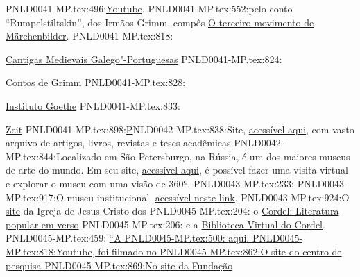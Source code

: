 {{{{{{{{{PNLD0041-MP.tex:496:\href{https://www.youtube.com/watch?v=1jdpM_spZe0&ab_channel=TheatroS%C3%A3oPedro}{Youtube}.
PNLD0041-MP.tex:552:pelo conto ``Rumpelstiltskin'', dos Irmãos Grimm, compôs \href{https://www.youtube.com/watch?v=zaX0IjTMChI&ab_channel=PacoM}{O terceiro movimento de Märchenbilder}.
PNLD0041-MP.tex:818:\item \href{https://cantigas.fcsh.unl.pt/index.asp}{Cantigas Medievais Galego"-Portuguesas}
PNLD0041-MP.tex:824:\item \href{https://www.grimmstories.com/pt/grimm_contos/index}{Contos de Grimm}
PNLD0041-MP.tex:828:\item \href{http://www.goethe.de/rio}{Instituto Goethe}
PNLD0041-MP.tex:833:\item \href{https://www.zeit.de/serie/kinderlieder?fbclid=IwAR0YTdmrrM24sDcmak__AxviJPibv0_Bxf9sx9XkX7g-4VxcKbNbRbVPrew&utm_referrer=https%3A%2F%2Fl.facebook.com%2F}{Zeit}
PNLD0041-MP.tex:898:\href{https://repositorio.unesp.br/bitstream/handle/11449/73913/2-s2.0-84872003268.pdf?sequence=1\&isAllowed=y}%
PNLD0042-MP.tex:838:Site, \href{http://www.fiocruz.br/bibsp/cgi/cgilua.exe/sys/start.htm?sid=107}{acessível aqui}, com vasto arquivo de artigos, livros, revistas e teses acadêmicas 
PNLD0042-MP.tex:844:Localizado em São Petersburgo, na Rússia, é um dos maiores museus de arte do mundo. Em seu site, \href{https://www.hermitagemuseum.org/wps/portal/hermitage/panorama/virtual_visit/panoramas-m-1/}{acessível aqui}, é possível fazer uma visita virtual e explorar o museu com uma visão de 360º.
PNLD0043-MP.tex:233:%
PNLD0043-MP.tex:917:O museu institucional, \href{https://marktwainhouse.org/}{acessível neste link},
PNLD0043-MP.tex:924:O \href{https://www.churchofjesuschrist.org/study/manual/old-testament-seminary-teacher-manual/introduction-to-the-book-of-genesis?lang=por}{site} da Igreja de Jesus Cristo dos 
PNLD0045-MP.tex:204:  o \href{http://www.casaruibarbosa.gov.br/cordel/acervo.html}{Cordel: Literatura popular em verso} 
PNLD0045-MP.tex:206:  e a \href{http://cordel.edel.univ-poitiers.fr}{Biblioteca Virtual do Cordel}.
PNLD0045-MP.tex:459:  \href{https://cantigas.fcsh.unl.pt/versaomusical.asp?cdcant=1307&cdvm=247}{``A
PNLD0045-MP.tex:500:  \href{https://youtu.be/8NBauvFV6bo}{aqui}.
PNLD0045-MP.tex:818:\href{https://www.youtube.com/watch?v=xFOZxwBcUmo}{Youtube}, foi filmado no
PNLD0045-MP.tex:862:O \href{http://cordel.edel.univ-poitiers.fr}{site} do centro de pesquisa
PNLD0045-MP.tex:869:No \href{http://www.casaruibarbosa.gov.br/cordel/acervo.html}{site} da Fundação
}}}}}}}}}}
